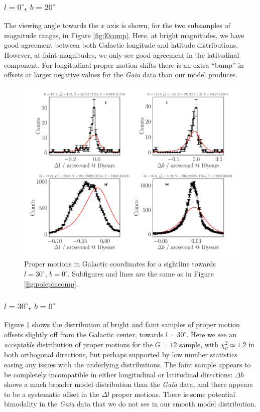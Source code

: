 \documentclass[fleqn,usenatbib]{mnras}
\begin{document}
\subsubsection{$l = 0^\circ$, $b = 20^\circ$}
The viewing angle towards the $x$ axis is shown, for the two subsamples of magnitude ranges, in Figure \ref{fig:l0comp}.
Here, at bright magnitudes, we have good agreement between both Galactic longitude and latitude distributions.
However, at faint magnitudes, we only see good agreement in the latitudinal component.
For longitudinal proper motion shifts there is an extra ``bump'' in offsets at larger negative values for the \textit{Gaia} data than our model produces.

\begin{figure}
    \centering
    \includegraphics[width=\columnwidth]{Plots/plots_pm_gaia_30_0.pdf}
    \caption{Proper motions in Galactic coordinates for a sightline towards $l = 30^\circ$, $b = 0^\circ$.
    Subfigures and lines are the same as in Figure \ref{fig:polepmcomp}.}
    \label{fig:l30comp}
\end{figure}

\subsubsection{$l = 30^\circ$, $b = 0^\circ$}
Figure \ref{fig:l30comp} shows the distribution of bright and faint samples of proper motion offsets slightly off from the Galactic center, towards $l = 30^\circ$.
Here we see an \textit{acceptable} distribution of proper motions for the $G = 12$ sample, with $\chi_\nu^2 \simeq 1.2$ in both orthogonal directions, but perhaps supported by low number statistics easing any issues with the underlying distributions.
The faint sample appears to be completely incompatible in either longitudinal or latitudinal directions: $\Delta b$ shows a much broader model distribution than the \textit{Gaia} data, and there appears to be a systematic offset in the $\Delta l$ proper motions.
There is some potential bimodality in the \textit{Gaia} data that we do not see in our smooth model distribution.
\end{document}
